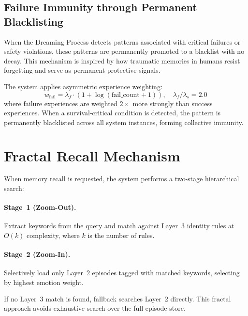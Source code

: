 \documentclass[11pt,a4paper]{article}
\begin{document}
\subsection{Failure Immunity through Permanent Blacklisting}

When the Dreaming Process detects patterns associated with critical failures or safety
violations, these patterns are permanently promoted to a blacklist with no decay. This
mechanism is inspired by how traumatic memories in humans resist forgetting and serve as
permanent protective signals.

The system applies asymmetric experience weighting:
\begin{equation}
  w_{\text{fail}} = \lambda_f \cdot (1 + \log(\text{fail\_count} + 1)),
  \quad \lambda_f / \lambda_s = 2.0
\end{equation}
where failure experiences are weighted $2\times$ more strongly than success experiences.
When a survival-critical condition is detected, the pattern is permanently blacklisted
across all system instances, forming collective immunity.

\section{Fractal Recall Mechanism}

When memory recall is requested, the system performs a two-stage hierarchical search:

\paragraph{Stage~1 (Zoom-Out).} Extract keywords from the query and match against Layer~3
identity rules at $O(k)$ complexity, where $k$ is the number of rules.

\paragraph{Stage~2 (Zoom-In).} Selectively load only Layer~2 episodes tagged with matched
keywords, selecting by highest emotion weight.

If no Layer~3 match is found, fallback searches Layer~2 directly. This fractal approach
avoids exhaustive search over the full episode store.

\end{document}
